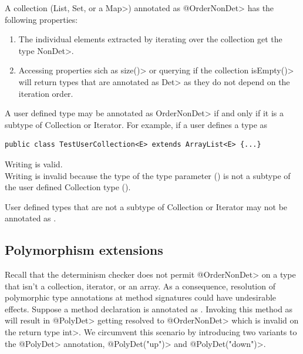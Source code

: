 A collection (\<List, Set, or a Map>) annotated as \<@OrderNonDet> has the following properties:
\begin{enumerate}
    \item The individual elements extracted by iterating over the collection get the type \<NonDet>.
    \item Accessing properties sich as \<size()> or querying if the collection \<isEmpty()> will return types
    that are annotated as \<Det> as they do not depend on the iteration order. 
\end{enumerate}

A user defined type may be annotated as \<OrderNonDet> if and only if it
is a subtype of Collection or Iterator.
For example, if a user defines a type as
\begin{verbatim}
public class TestUserCollection<E> extends ArrayList<E> {...}
\end{verbatim}
Writing  is valid.\\
Writing  is invalid
because the type of the type parameter () is not a subtype
of the user defined Collection type ().

User defined types that are not a subtype of Collection or Iterator
may not be annotated as .

\subsection{Polymorphism extensions}\label{polymorphism-extensions}

Recall that the determinism checker does not permit \<@OrderNonDet> on a type that isn't a collection, iterator, or an array.
As a consequence, resolution of polymorphic type annotations at method signatures could have undesirable effects.
Suppose a method declaration is annotated as . Invoking this method
as  will result in \<@PolyDet> getting resolved to \<@OrderNonDet> which is invalid
on the return type \<int>. We circumvent this scenario by introducing two variants to the \<@PolyDet> annotation, \<@PolyDet("up")>
and \<@PolyDet("down")>. 

%
%
%
%

